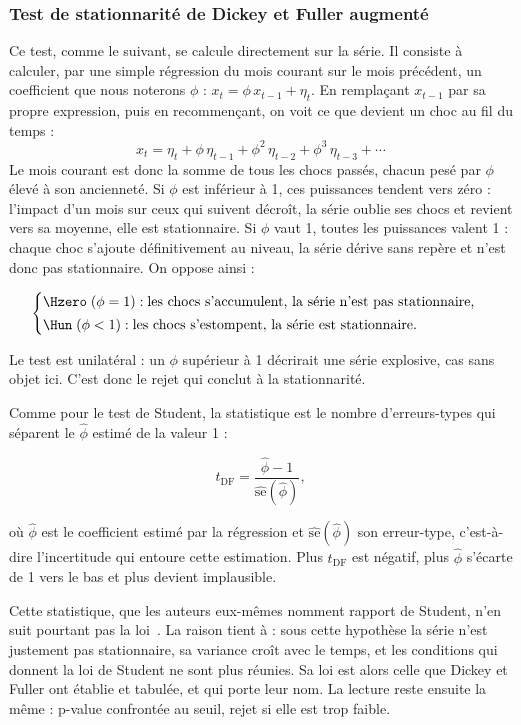 \subsubsection*{Test de stationnarité de Dickey et Fuller augmenté}

Ce test, comme le suivant, se calcule directement sur la série.
Il consiste à calculer, par une simple régression du
mois courant sur le mois précédent, un coefficient que nous noterons \(\phi\) :
\(x_t = \phi\, x_{t-1} + \eta_t\).
En remplaçant \(x_{t-1}\) par sa propre expression, puis en recommençant, on
voit ce que devient un choc au fil du temps :
\[
  x_t = \eta_t + \phi\,\eta_{t-1} + \phi^2\,\eta_{t-2} + \phi^3\,\eta_{t-3} + \cdots
\]
Le mois courant est donc la somme de tous les chocs passés, chacun pesé par
\(\phi\) élevé à son ancienneté. Si \(\phi\) est inférieur à 1, ces puissances
tendent vers zéro : l'impact d'un mois sur ceux qui suivent décroît, la série
oublie ses chocs et revient vers sa moyenne, elle est stationnaire. Si \(\phi\)
vaut 1, toutes les puissances valent 1 : chaque choc s'ajoute définitivement au
niveau, la série dérive sans repère et n'est donc pas stationnaire.
On oppose ainsi :

\[
  \begin{cases}
    \Hzero \;(\phi = 1) : \text{les chocs s'accumulent, la série n'est pas stationnaire,}\\[2pt]
    \Hun \;(\phi < 1) : \text{les chocs s'estompent, la série est stationnaire.}
  \end{cases}
\]

Le test est unilatéral : un \(\phi\) supérieur à 1 décrirait une série
explosive, cas sans objet ici. C'est donc le rejet qui conclut à la
stationnarité.

Comme pour le test de Student, la statistique est le nombre d'erreurs-types
qui séparent le \(\hat\phi\) estimé de la valeur 1 :

\[
  t_{\mathrm{DF}} = \frac{\hat\phi - 1}{\widehat{\mathrm{se}}(\hat\phi)},
\]


où \(\hat\phi\) est le coefficient estimé par la régression et
\(\widehat{\mathrm{se}}(\hat\phi)\) son erreur-type, c'est-à-dire
l'incertitude qui entoure cette estimation. Plus \(t_{\mathrm{DF}}\) est
négatif, plus \(\hat\phi\) s'écarte de 1 vers le bas et plus \Hzero{} devient
implausible.

Cette statistique, que les auteurs eux-mêmes nomment rapport de Student, n'en
suit pourtant pas la loi~\cite{dickeyfuller1979}. La raison tient à \Hzero{} :
sous cette hypothèse la série n'est justement pas stationnaire, sa variance
croît avec le temps, et les conditions qui donnent la loi de Student ne sont
plus réunies. Sa loi est alors celle que Dickey et Fuller ont établie et
tabulée, et qui porte leur nom. La lecture reste ensuite la même :
p-value confrontée au seuil, rejet si elle est trop faible.

